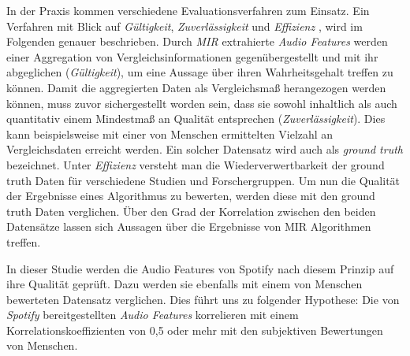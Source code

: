 In der Praxis kommen verschiedene Evaluationsverfahren zum Einsatz.
Ein Verfahren mit Blick auf \textit{Gültigkeit}, \textit{Zuverlässigkeit} und \textit{Effizienz} \cite{Urbano_2013}, wird im Folgenden genauer beschrieben.
Durch \textit{MIR} extrahierte \textit{Audio Features} werden einer Aggregation von Vergleichsinformationen gegenübergestellt und mit ihr abgeglichen (\textit{Gültigkeit}), um eine Aussage über ihren Wahrheitsgehalt treffen zu können.
Damit die aggregierten Daten als Vergleichsmaß herangezogen werden können, muss zuvor sichergestellt worden sein, dass sie sowohl inhaltlich als auch quantitativ einem Mindestmaß an Qualität entsprechen (\textit{Zuverlässigkeit}).
Dies kann beispielsweise mit einer von Menschen ermittelten Vielzahl an Vergleichsdaten erreicht werden.
Ein solcher Datensatz wird auch als \textit{ground truth} bezeichnet.
Unter \textit{Effizienz} versteht man die Wiederverwertbarkeit der ground truth Daten für verschiedene Studien und Forschergruppen.
Um nun die Qualität der Ergebnisse eines Algorithmus zu bewerten, werden diese mit den ground truth Daten verglichen.
Über den Grad der Korrelation zwischen den beiden Datensätze lassen sich Aussagen über die Ergebnisse von MIR Algorithmen treffen.

In dieser Studie werden die Audio Features von Spotify nach diesem Prinzip auf ihre Qualität geprüft.
Dazu werden sie ebenfalls mit einem von Menschen bewerteten Datensatz verglichen.
Dies führt uns zu folgender Hypothese:
Die von \textit{Spotify} bereitgestellten \textit{Audio Features} korrelieren mit einem Korrelationskoeffizienten von 0,5 oder mehr mit den subjektiven Bewertungen von Menschen.

